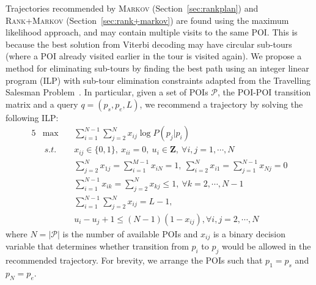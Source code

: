 Trajectories recommended by \textsc{Markov} (Section~\ref{sec:rankplan}) and \textsc{Rank+Markov} (Section~\ref{sec:rank+markov})
are found using the maximum likelihood approach, and may contain multiple visits to the same POI.
This is because the best solution from Viterbi decoding %
may have 
circular sub-tours (where a POI already visited earlier in the tour is visited again).
We propose a method for eliminating sub-tours by %
%
finding the best path using an integer linear program (ILP) with
sub-tour elimination constraints adapted from the Travelling Salesman Problem~\cite{opt98}.
In particular, given a set of POIs $\mathcal{P}$, the POI-POI transition matrix and a query $q = (p_s, p_e, L)$,
we recommend a trajectory by solving the following ILP:
\begin{alignat}{5}
& \max  ~&& \sum_{i=1}^{N-1} \sum_{j=2}^N x_{ij} \log P(p_j | p_i)                                                 \label{eq:obj} \\ %
& ~s.t. ~&& x_{ij} \in \{0, 1\}, ~x_{ii} = 0, ~u_i \in \mathbf{Z}, ~\forall i, j = 1, \cdots, N                    \label{eq:cons1} \\
&        && \sum_{j=2}^N x_{1j} = \sum_{i=1}^{M-1} x_{iN} = 1, ~\sum_{i=2}^N x_{i1} = \sum_{j=1}^{N-1} x_{Nj} = 0  \label{eq:cons2} \\
&        && \sum_{i=1}^{N-1} x_{ik} = \sum_{j=2}^N x_{kj} \le 1,   ~\forall k=2, \cdots, N-1                       \label{eq:cons3} \\
&        && \sum_{i=1}^{N-1} \sum_{j=2}^N x_{ij} = L-1,                                                            \label{eq:cons4} \\
&        && u_i - u_j + 1 \le (N-1) (1-x_{ij}),                     \forall i, j = 2, \cdots, N                    \label{eq:cons5}
\end{alignat}
where $N=|\mathcal{P}|$ is the number of available POIs and $x_{ij}$ is a binary decision variable 
that determines whether transition from $p_i$ to $p_j$ would be allowed in the recommended trajectory.
For brevity, we arrange the POIs such that $p_1 = p_s$ and $p_N = p_e$.
